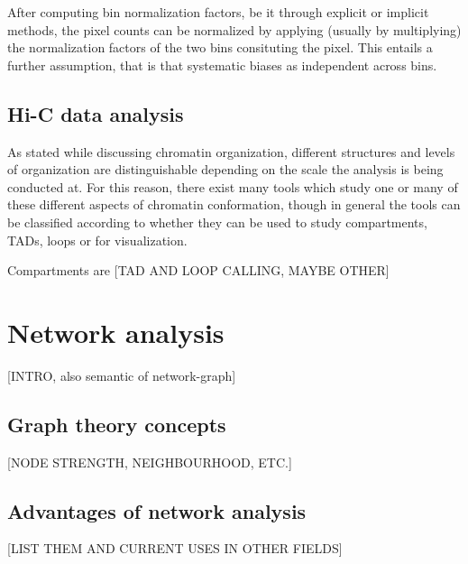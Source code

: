 After computing bin normalization factors, be it through explicit or implicit methods, the pixel counts can be normalized by applying (usually by multiplying) the normalization factors of the two bins consituting the pixel. This entails a further assumption, that is that systematic biases as independent across bins.

\subsection{Hi-C data analysis}

As stated while discussing chromatin organization, different structures and levels of organization are distinguishable depending on the scale the analysis is being conducted at. For this reason, there exist many tools which study one or many of these different aspects of chromatin conformation, though in general the tools can be classified according to whether they can be used to study compartments, TADs, loops or for visualization\cite{hicprocessing2018}.

Compartments are 
[TAD AND LOOP CALLING, MAYBE OTHER]


\section{Network analysis}

[INTRO, also semantic of network-graph]

\subsection{Graph theory concepts}
[NODE STRENGTH, NEIGHBOURHOOD, ETC.]

\subsection{Advantages of network analysis}
[LIST THEM AND CURRENT USES IN OTHER FIELDS]

